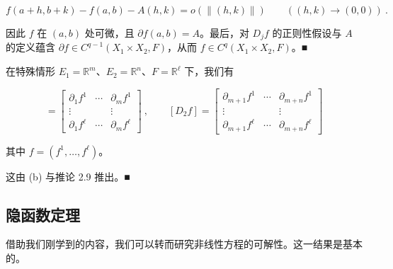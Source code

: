\begin{remark}
\begin{items}
\begin{subitems}
\[
f(a+h,b+k)-f(a,b)-A(h,k)=o(\|(h,k)\|)\qquad((h,k)\to(0,0)) \ .
\]

因此 $ f $ 在 $ (a,b) $ 处可微，且 $ \partial f(a,b)=A $。最后，对 $ D_{j}f $ 的正则性假设与 $ A $ 的定义蕴含 $ \partial f\in C^{q-1}(X_{1}\times X_{2},F) $，从而 $ f\in C^{q}(X_{1}\times X_{2},F) $。\nobreak\hspace{0.35em}■

\end{subitems}

\item

在特殊情形 $ E_{1}=\mathbb{R}^{m} $、$ E_{2}=\mathbb{R}^{n} $、$ F=\mathbb{R}^{\ell} $ 下，我们有

\begin{equation*}
[D_{1}f]=\begin{bmatrix}\partial_{1}f^{1} & \cdots & \partial_{m}f^{1}\\ \vdots & & \vdots\\ \partial_{1}f^{\ell} & \cdots & \partial_{m}f^{\ell}\end{bmatrix}\ ,\qquad[D_{2}f]=\begin{bmatrix}\partial_{m+1}f^{1} & \cdots & \partial_{m+n}f^{1}\\ \vdots & & \vdots\\ \partial_{m+1}f^{\ell} & \cdots & \partial_{m+n}f^{\ell}\end{bmatrix}
\end{equation*}

其中 $ f=(f^{1},\ldots,f^{\ell}) $。

\proofhead
这由 (b) 与推论 2.9 推出。\nobreak\hspace{0.35em}■
\end{items}

\end{remark}

\subsection*{隐函数定理}

借助我们刚学到的内容，我们可以转而研究非线性方程的可解性。这一结果是基本的。

